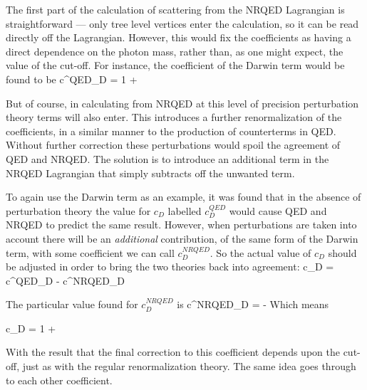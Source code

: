 The first part of the calculation of scattering from the NRQED Lagrangian is straightforward --- only tree level vertices enter the calculation, so it can be read directly off the Lagrangian.  However, this would fix the coefficients as having a direct dependence on the photon mass, rather than, as one might expect, the value of the cut-off.  For instance, the coefficient of the Darwin term would be found to be
\beq
	c^{QED}_D = 1 + \frac{\alpha}{\pi} 
\eeq

But of course, in calculating from NRQED at this level of precision perturbation theory terms will also enter. This introduces a further renormalization of the coefficients, in a similar manner to the production of counterterms in QED.  Without further correction these perturbations would spoil the agreement of QED and NRQED.  The solution is to introduce an additional term in the NRQED Lagrangian that simply subtracts off the unwanted term.

To again use the Darwin term as an example, it was found that in the absence of perturbation theory the value for $c_D$ labelled $c^{QED}_D$ would cause QED and NRQED to predict the same result.  However, when perturbations are taken into account there will be an {\it additional} contribution, of the same form of the Darwin term, with some coefficient we can call $c^{NRQED}_D$.  So the actual value of $c_D$ should be adjusted in order to bring the two theories back into agreement:
\beq
	c_D = c^{QED}_D - c^{NRQED}_D
\eeq

The particular value found for $c^{NRQED}_D$ is 
\beq
	c^{NRQED}_D = -\frac{\alpha}{\pi} 
\eeq
Which means

\beq
	c_D = 1 + \frac{\alpha}{\pi} 
\eeq

With the result that the final correction to this coefficient depends upon the cut-off, just as with the regular renormalization theory.  The same idea goes through to each other coefficient.

	